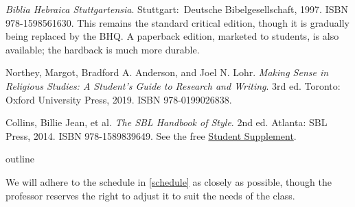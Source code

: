 \documentclass[titlepage]{article}
\begin{document}
\begingroup
\renewcommand{\section}[2]{}%
\begin{thebibliography}{Making Sense}%

    \emph{Biblia Hebraica Stuttgartensia}.
    Stuttgart: Deutsche Bibel\-ge\-sell\-schaft, 1997. ISBN 978-1598561630.
    This remains the standard critical edition, though it is gradually
    being replaced by the BHQ. A paperback edition, marketed to
    students, is also available; the hardback is much more durable.

	 Northey, Margot, Bradford A. Anderson, and Joel N. Lohr.
	\emph{Making Sense in Religious Studies: A Student's Guide to Research and Writing}.
	3rd ed. Toronto: Oxford University Press, 2019. ISBN 978-0199026838.

	 Collins, Billie Jean, et al.
	\emph{The SBL Handbook of Style}.
	2nd ed. Atlanta: SBL Press, 2014. ISBN 978-1589839649. See the free
	\href{https://www.sbl-site.org/assets/pdfs/pubs/SBLHSsupp2015-02.pdf}{Student Supplement}.

\end{thebibliography}
\endgroup

\section{Course Outline}
\label{outline}

We will adhere to the schedule in \autoref{schedule} as closely as
possible, though the professor reserves the right to adjust it to suit
the needs of the class.
\end{document}

